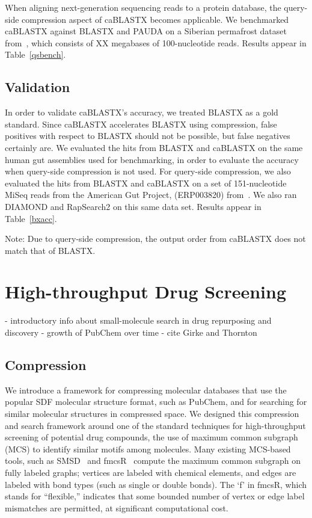 \documentclass{amsbook}
\theoremstyle{definition}
\theoremstyle{remark}
\numberwithin{equation}{section}
\begin{document}
When aligning next-generation sequencing reads to a protein database, the
query-side compression aspect of caBLASTX becomes applicable.
We benchmarked caBLASTX against BLASTX and PAUDA on a Siberian
permafrost dataset from~\cite{blah}, which consists of XX megabases of
100-nucleotide reads.
Results appear in Table~\ref{qsbench}.



\subsection*{Validation}

In order to validate caBLASTX's accuracy, we treated BLASTX as a gold standard. 
Since caBLASTX accelerates BLASTX
using compression, false positives with respect to BLASTX should not be
possible, but false negatives certainly are.
We evaluated the hits from BLASTX and caBLASTX on the same human gut
assemblies used for benchmarking, in order to evaluate the accuracy when
query-side compression is not used.
For query-side compression, we also evaluated the hits from BLASTX and caBLASTX
on a set of 151-nucleotide MiSeq reads from the American Gut Project,
(ERP003820) from~\cite{blah}.
We also ran DIAMOND and RapSearch2 on this same data set.
Results appear in Table~\ref{bxacc}.

Note: Due to query-side compression, the output order from caBLASTX does not
match that of BLASTX.

\section*{High-throughput Drug Screening}

- introductory info about small-molecule search in drug repurposing and discovery
- growth of PubChem over time
- cite Girke and Thornton

\subsection*{Compression}

We introduce a framework for compressing molecular databases that use the 
popular SDF molecular structure format, such as PubChem, and for searching for 
similar molecular structures in compressed space.
We designed this compression and search framework around one of the standard 
techniques for high-throughput screening of potential drug compounds, the use 
of maximum common subgraph (MCS) to identify similar motifs among molecules.
Many existing MCS-based tools, such as SMSD~\cite{thornton} and 
fmcsR~\cite{girke} compute the maximum common subgraph on fully labeled graphs; 
vertices are labeled with chemical elements, and edges are labeled with bond 
types (such as single or double bonds).
The `f' in fmcsR, which stands for ``flexible,'' indicates that some bounded 
number of vertex or edge label mismatches are permitted, at significant 
computational cost.
\end{document}
